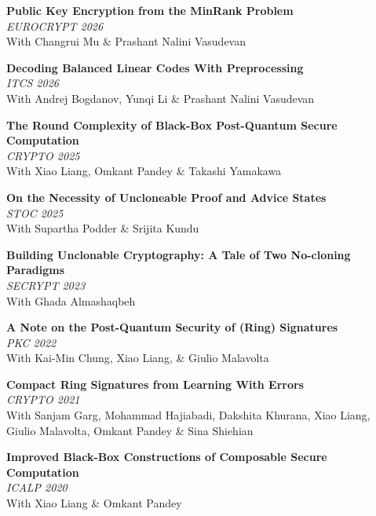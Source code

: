 \documentclass[margin]{res}
\begin{document}
\begin{resume}
\textbf{Public Key Encryption from the MinRank Problem}\\ {\it EUROCRYPT 2026} \\
With Changrui Mu \& Prashant Nalini Vasudevan

\textbf{Decoding Balanced Linear Codes With Preprocessing}\\ {\it ITCS 2026} \\
With Andrej Bogdanov, Yunqi Li \& Prashant Nalini Vasudevan

\textbf{The Round Complexity of Black-Box Post-Quantum Secure Computation}\\ {\it CRYPTO 2025} \\
With Xiao Liang, Omkant Pandey \& Takashi Yamakawa


\textbf{On the Necessity of Uncloneable Proof and Advice States}\\ {\it STOC 2025} \\
With Supartha Podder \& Srijita Kundu


\textbf{Building Unclonable Cryptography: A Tale of Two No-cloning Paradigms}\\ {\it SECRYPT 2023} \\
With Ghada Almashaqbeh


\textbf{A Note on the Post-Quantum Security of (Ring) Signatures}\\ {\it PKC 2022} \\
With Kai-Min Chung, Xiao Liang, \& Giulio Malavolta


\textbf{Compact Ring Signatures from Learning With Errors}\\ {\it CRYPTO 2021} \\
With Sanjam Garg, Mohammad Hajiabadi, Dakshita Khurana, Xiao Liang, Giulio Malavolta, Omkant Pandey \& Sina Shiehian


\textbf{Improved Black-Box Constructions of Composable Secure Computation}\\ {\it ICALP 2020} \\
With Xiao Liang \& Omkant Pandey





\end{resume}
\end{document}

